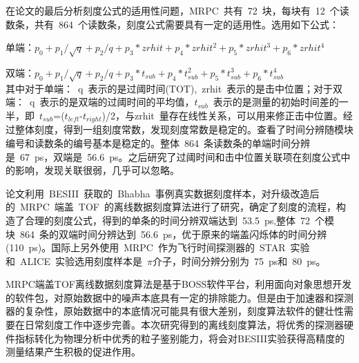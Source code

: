 在论文的最后分析刻度公式的适用性问题，MRPC~共有~72~块，每块有~12~个读数条，共有~864~个读数条，刻度公式需要具有一定的适用性。选用如下公式：

单端：$p_{0}+p_{1}/\sqrt{q}+p_{2}/q+p_{3}*zrhit+p_{4}*zrhit^{2}+p_{5}*zrhit^{3}+p_{6}*zrhit^{4}$

双端：$p_{0}+p_{1}/\sqrt{q}+p_{2}/q+p_{3}*t_{sub}+p_{4}*t_{sub}^{2}+p_{5}*t_{sub}^{3}+p_{6}*t_{sub}^{4}$\\
其中对于单端：~q~表示的是过阈时间(TOT),~zrhit~表示的是击中位置；对于双端：~q~表示的是双端的过阈时间的平均值，$t_{sub}$~表示的是测量的初始时间差的一半，即~$t_{sub}$=($t_{left}$-$t_{right}$)/2，与zrhit~量存在线性关系，可以用来修正击中位置。经过整体刻度，得到一组刻度常数，发现刻度常数是稳定的。查看了时间分辨随模块编号和读数条的编号基本是稳定的。整体~864~条读数条的单端时间分辨是~67~ps，双端是~56.6~ps。之后研究了过阈时间和击中位置关联项在刻度公式中的影响，发现关联很弱，几乎可以忽略。

论文利用~BESIII~获取的~Bhabha~事例真实数据刻度样本，对升级改造后的~MRPC~端盖~TOF~的离线数据刻度算法进行了研究，确定了刻度的流程，构造了合理的刻度公式，得到的单条的时间分辨双端达到~53.5~ps,整体~72~个模块~864~条的双端时间分辨达到~56.6~ps，优于原来的端盖闪烁体的时间分辨(110~ps)。国际上另外使用~MRPC~作为飞行时间探测器的~STAR~实验和~ALICE~实验选用刻度样本是~$\pi$介子，时间分辨分别为~75~ps和~80~ps。

MRPC端盖TOF离线数据刻度算法是基于BOSS软件平台，利用面向对象思想开发的软件包，对原始数据中的噪声本底具有一定的排除能力。但是由于加速器和探测器的复杂性，原始数据中的本底情况可能具有很大差别，刻度算法软件的健壮性需要在日常刻度工作中逐步完善。本次研究得到的离线刻度算法，将优秀的探测器硬件指标转化为物理分析中优秀的粒子鉴别能力，将会对BESIII实验获得高精度的测量结果产生积极的促进作用。













